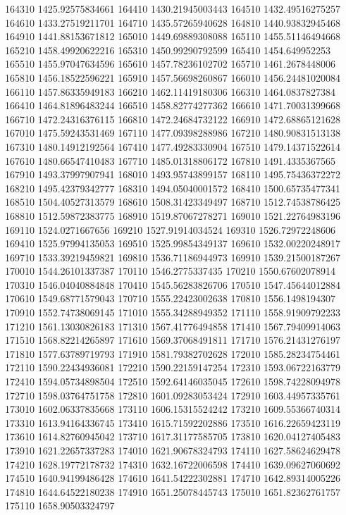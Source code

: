 {164310 1425.92575834661
164410 1430.21945003443
164510 1432.49516275257
164610 1433.27519211701
164710 1435.57265940628
164810 1440.93832945468
164910 1441.88153671812
165010 1449.69889308088
165110 1455.51146494668
165210 1458.49920622216
165310 1450.99290792599
165410 1454.649952253
165510 1455.97047634596
165610 1457.78236102702
165710 1461.2678448006
165810 1456.18522596221
165910 1457.56698260867
166010 1456.24481020084
166110 1457.86335949183
166210 1462.11419180306
166310 1464.0837827384
166410 1464.81896483244
166510 1458.82774277362
166610 1471.70031399668
166710 1472.24316376115
166810 1472.24684732122
166910 1472.68865121628
167010 1475.59243531469
167110 1477.09398288986
167210 1480.90831513138
167310 1480.14912192564
167410 1477.49283330904
167510 1479.14371522614
167610 1480.66547410483
167710 1485.01318806172
167810 1491.4335367565
167910 1493.37997907941
168010 1493.95743899157
168110 1495.75436372272
168210 1495.42379342777
168310 1494.05040001572
168410 1500.65735477341
168510 1504.40527313579
168610 1508.31423349497
168710 1512.74538786425
168810 1512.59872383775
168910 1519.87067278271
169010 1521.22764983196
169110 1524.0271667656
169210 1527.91914034524
169310 1526.72972248606
169410 1525.97994135053
169510 1525.99854349137
169610 1532.00220248917
169710 1533.39219459821
169810 1536.71186944973
169910 1539.21500187267
170010 1544.26101337387
170110 1546.2775337435
170210 1550.67602078914
170310 1546.04040884848
170410 1545.56283826706
170510 1547.45644012884
170610 1549.68771579043
170710 1555.22423002638
170810 1556.1498194307
170910 1552.74738069145
171010 1555.34288949352
171110 1558.91909792233
171210 1561.13030826183
171310 1567.41776494858
171410 1567.79409914063
171510 1568.82214265897
171610 1569.37068491811
171710 1576.21431276197
171810 1577.63789719793
171910 1581.79382702628
172010 1585.28234754461
172110 1590.22434936081
172210 1590.22159147254
172310 1593.06722163779
172410 1594.05734898504
172510 1592.64146035045
172610 1598.74228094978
172710 1598.03764751758
172810 1601.09283053424
172910 1603.44957335761
173010 1602.06337835668
173110 1606.15315524242
173210 1609.55366740314
173310 1613.94164336745
173410 1615.71592202886
173510 1616.22659423119
173610 1614.82760945042
173710 1617.31177585705
173810 1620.04127405483
173910 1621.22657337283
174010 1621.90678324793
174110 1627.58624629478
174210 1628.19772178732
174310 1632.16722006598
174410 1639.09627060692
174510 1640.94199486428
174610 1641.54222302881
174710 1642.89314005226
174810 1644.64522180238
174910 1651.25078445743
175010 1651.82362761757
175110 1658.90503324797
}
